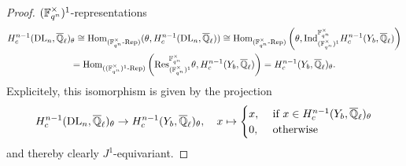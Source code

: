 \documentclass[../main.tex]{subfiles}
\begin{document}
\begin{prop}
\begin{proof}
    $(\mathbb{F}_{q^n}^\times)^1$-representations
    \begin{multline*}
      H^{n-1}_c(\mathrm{DL}_n, {\overline {\mathbb{Q}}_\ell})_\theta \cong 
      \operatorname{Hom}_{{({\mathbb{F}_{q^n}^\times}\text-\allowbreak\mathrm{Rep})}}(\theta, H^{n-1}_c(\mathrm{DL}_n, {\overline {\mathbb{Q}}_\ell})) 
      \cong 
      \operatorname{Hom}_{{({\mathbb{F}_{q^n}^\times}\text-\allowbreak\mathrm{Rep})}}\left(\theta,
      \mathrm{Ind}_{(\mathbb{F}_{q^n}^\times)^1}^{\mathbb{F}_{q^n}^\times}H_c^{n-1}(Y_b, {\overline {\mathbb{Q}}_\ell}) \right) \\
      = 
      \operatorname{Hom}_{{({(\mathbb{F}_{q^n}^\times)^1}\text-\allowbreak\mathrm{Rep})}}
      \left(\mathrm{Res}^{\mathbb{F}_{q^n}^\times}_{(\mathbb{F}_{q^n}^\times)^1} \theta,
        H_c^{n-1}(Y_b, {\overline {\mathbb{Q}}_\ell}) \right) = H_c^{n-1}(Y_b, {\overline {\mathbb{Q}}_\ell})_\theta.
    \end{multline*}
    Explicitely, this isomorphism is given by the projection
    \begin{equation*}
      H^{n-1}_c(\mathrm{DL}_n, {\overline {\mathbb{Q}}_\ell})_\theta \to H^{n-1}_c(Y_b, {\overline {\mathbb{Q}}_\ell})_\theta ,
      \quad x \mapsto \begin{cases}
        x, &\text{ if }x \in H_c^{n-1}(Y_b, {\overline {\mathbb{Q}}_\ell})_\theta \\
        0, &\text{ otherwise}
      \end{cases}
    \end{equation*}
    and thereby clearly $J^1$-equivariant.
  \end{proof}
\end{prop}
\end{document}
